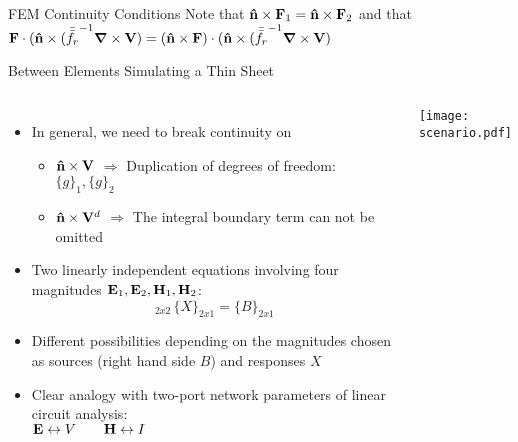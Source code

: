 \begin{frame}[allowframebreaks]{FEM Continuity Conditions}
  Note that $\mathbf{\hat{n}}\times\mathbf{F}_1=\mathbf{\hat{n}}\times\mathbf{F}_2$ and that
  $ \mathbf{F}\cdot(\mathbf{\hat{n}} \times ( {\bar{\bar{f_r}}}^{-1} \boldsymbol{\nabla} \times
  \mathbf{V}) = (\mathbf{\hat{n}}\times\mathbf{F})\cdot(\mathbf{\hat{n}} \times (
  {\bar{\bar{f_r}}}^{-1} \boldsymbol{\nabla} \times \mathbf{V} )$

  \framebreak  %

   \begin{block}{Between Elements Simulating  a Thin Sheet}
    \begin{columns}
       \centering
       \begin{itemize}\setlength{\itemsep}{0.3\baselineskip}

       \item In general, we need to break continuity on
          
         \begin{itemize}
         \item $\mathbf{\hat{n}}\times\mathbf{V}$ $\Rightarrow$ Duplication of degrees
           of freedom: $\lbrace g\rbrace_1,\lbrace g\rbrace_2$
         \item $\mathbf{\hat{n}}\times\mathbf{V}^d$ $\Rightarrow$ The integral
           boundary term can not be omitted
         \end{itemize}

       \item Two linearly independent equations involving four
         magnitudes $\mathbf{E}_1,\mathbf{E}_2,\mathbf{H}_1,\mathbf{H}_2$:
         \begin{equation*}
          [~]_{2x2}\, \lbrace X \rbrace_{2x1}=\lbrace B \rbrace_{2x1}
        \end{equation*}

      \item \alert{Different possibilities depending on the magnitudes chosen
        as sources (right hand side $B$) and responses $X$}

      \item Clear analogy with two-port network parameters of linear
        circuit analysis: \\
        {\centering$\mathbf{E}\leftrightarrow V \qquad \mathbf{H}\leftrightarrow I$}
      \end{itemize}
      
       \centering
      \texttt{[image: scenario.pdf]}
    \end{columns}
   \end{block}

\end{frame}

